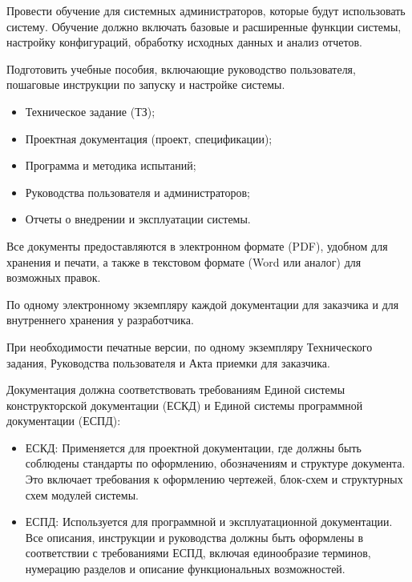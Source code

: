 
Провести обучение для системных администраторов,
которые будут использовать систему.
Обучение должно включать базовые и расширенные функции системы,
настройку конфигураций, обработку исходных данных и анализ отчетов.

Подготовить учебные пособия, включающие руководство пользователя,
пошаговые инструкции по запуску и настройке системы.



\begin{itemize}
	\item Техническое задание (ТЗ);
	\item Проектная документация (проект, спецификации);
	\item Программа и методика испытаний;
	\item Руководства пользователя и администраторов;
	\item Отчеты о внедрении и эксплуатации системы.
\end{itemize}



Все документы предоставляются в электронном формате (PDF),
удобном для хранения и печати,
а также в текстовом формате (Word или аналог) для возможных правок.


По одному электронному экземпляру каждой документации
для заказчика и для внутреннего хранения у разработчика.

При необходимости печатные версии, по одному экземпляру Технического задания,
Руководства пользователя и Акта приемки для заказчика.


Документация должна соответствовать требованиям
Единой системы конструкторской документации (ЕСКД)
и Единой системы программной документации (ЕСПД):

\begin{itemize}
	\item ЕСКД: Применяется для проектной документации,
	где должны быть соблюдены стандарты по оформлению, обозначениям
	и структуре документа.
	Это включает требования к оформлению чертежей,
	блок-схем и структурных схем модулей системы.
	\item ЕСПД: Используется для программной и эксплуатационной документации.
	Все описания, инструкции и руководства должны быть оформлены
	в соответствии с требованиями ЕСПД, включая единообразие терминов,
	нумерацию разделов и описание функциональных возможностей.
\end{itemize}

